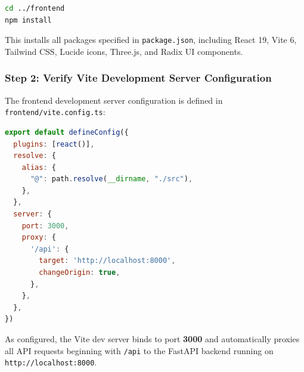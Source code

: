 \begin{lstlisting}[language=bash, caption={Installing Frontend Dependencies}]
cd ../frontend
npm install
\end{lstlisting}

\noindent This installs all packages specified in \texttt{package.json}, including React 19, Vite 6, Tailwind CSS, Lucide icons, Three.js, and Radix UI components.

\subsubsection{Step 2: Verify Vite Development Server Configuration}
The frontend development server configuration is defined in \texttt{frontend/vite.config.ts}:

\begin{lstlisting}[language=javascript, caption={Vite Server Port and Reverse Proxy in vite.config.ts}]
export default defineConfig({
  plugins: [react()],
  resolve: {
    alias: {
      "@": path.resolve(__dirname, "./src"),
    },
  },
  server: {
    port: 3000,
    proxy: {
      '/api': {
        target: 'http://localhost:8000',
        changeOrigin: true,
      },
    },
  },
})
\end{lstlisting}

\noindent As configured, the Vite dev server binds to port \textbf{3000} and automatically proxies all API requests beginning with \texttt{/api} to the FastAPI backend running on \texttt{http://localhost:8000}.

